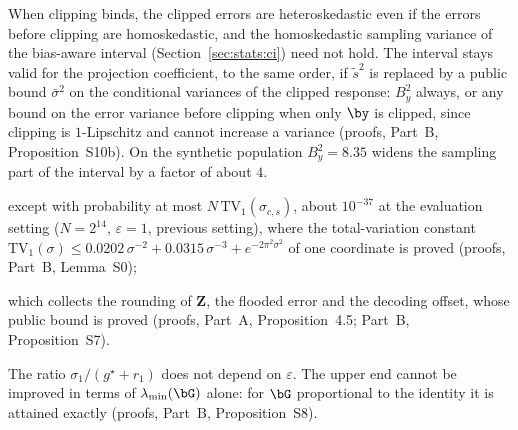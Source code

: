 When clipping binds, the clipped errors are heteroskedastic even if the errors before clipping are homoskedastic, and the homoskedastic sampling variance of the bias-aware interval (Section~\ref{sec:stats:ci}) need not hold. The interval stays valid for the projection coefficient, to the same order, if $\tilde s^2$ is replaced by a public bound $\bar\sigma^2$ on the conditional variances of the clipped response: $B_y^2$ always, or any bound on the error variance before clipping when only $\by$ is clipped, since clipping is $1$-Lipschitz and cannot increase a variance (proofs, Part~B, Proposition~S10b). On the synthetic population $B_y^2 = 8.35$ widens the sampling part of the interval by a factor of about $4$.


except with probability at most $N\,\mathrm{TV}_1(\sigma_{c,s})$, about $10^{-37}$ at the evaluation setting ($N = 2^{14}$, $\varepsilon = 1$, previous setting), where the total-variation constant $\mathrm{TV}_1(\sigma) \le 0.0202\,\sigma^{-2} + 0.0315\,\sigma^{-3} + e^{-2\pi^2\sigma^2}$ of one coordinate is proved (proofs, Part~B, Lemma~S0);

which collects the rounding of $\mathbf Z$, the flooded error and the decoding offset, whose public bound is proved (proofs, Part~A, Proposition~4.5; Part~B, Proposition~S7).

The ratio $\sigma_1/(g^\star + r_1)$ does not depend on $\varepsilon$. The upper end cannot be improved in terms of $\lambda_{\min}(\bG)$ alone: for $\bG$ proportional to the identity it is attained exactly (proofs, Part~B, Proposition~S8).

